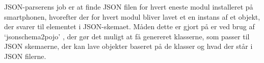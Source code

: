 JSON-parserens job er at finde JSON filen for hvert eneste modul installeret på smartphonen, hvorefter der for hvert modul bliver lavet et en instans af et objekt, der svarer til  elementet i JSON-skemaet.
Måden dette er gjort på er ved brug af `jsonschema2pojo' \citep{jsonpojo}, der gør det muligt at få genereret klasserne, som passer til JSON skemaerne, der kan lave objekter baseret på de klasser og hvad der står i JSON filerne. 